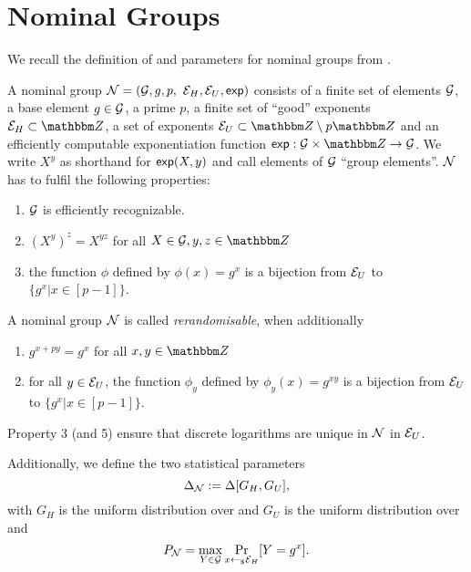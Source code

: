 \section{Nominal Groups}\label{app:nominal_groups}
We recall the definition of and parameters for nominal groups from \cite{EC:ABHKLR21_2}.

\begin{definition}
  A nominal group $\mathcal{N} = (\mathcal{G}, g, p, $ $\mathcal{E}_H, \mathcal{E}_U, \textnormal{\sf exp})$ consists of a finite set of elements $\mathcal{G}$, a base element $g
  \in \mathcal{G}$, a prime $p$, a finite set of ``good'' exponents $\nGE \subset \Z$, a set of exponents $\nGU\subset
  \Z\setminus p\Z$ and an efficiently computable exponentiation function $\nGexp: \nG \times \Z \rightarrow \nG$. We
  write $X^y$ as shorthand for $\textnormal{\sf exp}(X,y)$ and call elements of $\mathcal{G}$ ``group elements''.
  $\mathcal{N}$ has to fulfil the following properties:
  \begin{enumerate}
  \item $\mathcal{G}$ is efficiently recognizable.
  \item $\left(X^y\right)^z = X^{yz}$ for all $X \in \nG, y,z\in\Z$
  \item the function $\phi$ defined by $\phi(x) = g^x$ is a bijection from $\mathcal{E}_U$ to $\{g^x | x\in[p-1]\}$.
  \end{enumerate}
  A nominal group $\mathcal{N}$ is called \emph{rerandomisable}, when additionally
  \begin{enumerate}[resume]
  \item $g^{x+py} = g^x$ for all $x,y\in\Z$
  \item for all $y\in\mathcal{E}_U$, the function $\phi_y$ defined by $\phi_y(x) = g^{xy}$ is a bijection from $\mathcal{E}_U$ to $\{g^x |
    x \in [p-1]\}$.
  \end{enumerate}

  Property 3 (and 5) ensure that discrete logarithms are unique in $\mathcal{N}$ in $\mathcal{E}_U$. 
  
  Additionally, we define the two statistical parameters
  \[
    \Delta_{\mathcal{N}} := \Delta[G_H, G_U],
  \]
  with $G_H$ is the uniform distribution over \nGE and $G_U$ is the uniform distribution over \nGU and
  \[
    P_\mathcal{N} = \max_{Y \in \mathcal{G}} \underset{x\gets_{\scriptscriptstyle\$} \mathcal{E}_H}{\text{Pr}}[Y = g^x].
  \]
\end{definition}

